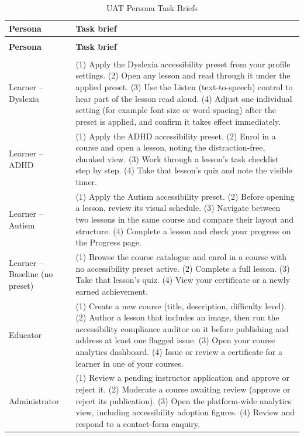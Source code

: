 \documentclass[12pt, oneside]{article} %
\newcommand{\tabbreak}{\hyphenpenalty=200\exhyphenpenalty=200\tolerance=4000\hbadness=10000\hspace{0pt}}
\begin{document}
{
\renewcommand{\arraystretch}{1.2}
\footnotesize
\begin{longtable}{|>{\raggedright\arraybackslash\tabbreak}p{3.0cm}|>{\raggedright\arraybackslash\tabbreak}p{11.0cm}|}
\caption{UAT Persona Task Briefs}
\label{tab:uat_personas}\\
\hline
\textbf{Persona} & \textbf{Task brief} \\
\hline \hline
\endfirsthead
\multicolumn{2}{l}{\footnotesize\itshape Table~\ref{tab:uat_personas} continued from the previous page}\\
\hline
\textbf{Persona} & \textbf{Task brief} \\
\hline \hline
\endhead
\hline
\multicolumn{2}{r}{\footnotesize\itshape continued on the next page}\\
\endfoot
\endlastfoot
Learner -- Dyslexia & (1) Apply the Dyslexia accessibility preset from your profile settings. (2) Open any lesson and read through it under the applied preset. (3) Use the Listen (text-to-speech) control to hear part of the lesson read aloud. (4) Adjust one individual setting (for example font size or word spacing) after the preset is applied, and confirm it takes effect immediately. \\ \hline
Learner -- ADHD & (1) Apply the ADHD accessibility preset. (2) Enrol in a course and open a lesson, noting the distraction-free, chunked view. (3) Work through a lesson's task checklist step by step. (4) Take that lesson's quiz and note the visible timer. \\ \hline
Learner -- Autism & (1) Apply the Autism accessibility preset. (2) Before opening a lesson, review its visual schedule. (3) Navigate between two lessons in the same course and compare their layout and structure. (4) Complete a lesson and check your progress on the Progress page. \\ \hline
Learner -- Baseline (no preset) & (1) Browse the course catalogue and enrol in a course with no accessibility preset active. (2) Complete a full lesson. (3) Take that lesson's quiz. (4) View your certificate or a newly earned achievement. \\ \hline
Educator & (1) Create a new course (title, description, difficulty level). (2) Author a lesson that includes an image, then run the accessibility compliance auditor on it before publishing and address at least one flagged issue. (3) Open your course analytics dashboard. (4) Issue or review a certificate for a learner in one of your courses. \\ \hline
Administrator & (1) Review a pending instructor application and approve or reject it. (2) Moderate a course awaiting review (approve or reject its publication). (3) Open the platform-wide analytics view, including accessibility adoption figures. (4) Review and respond to a contact-form enquiry. \\ \hline
\end{longtable}
}
\end{document}
